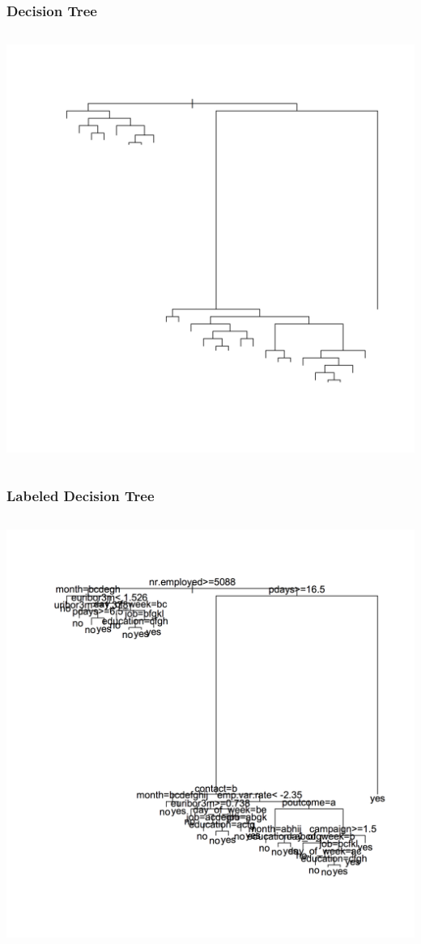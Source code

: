 \documentclass{beamer}
\begin{document}
\begin{frame}
  \frametitle{Decision Tree}
	\begin{columns}[c] %
    \includegraphics[height=\textheight]{tree}
  \end{columns}
\end{frame}


\begin{frame}
  \frametitle{Labeled Decision Tree}
	\begin{columns}[c] %
    \includegraphics[height=\textheight]{labeled_tree}
  \end{columns}
\end{frame}
\end{document}
